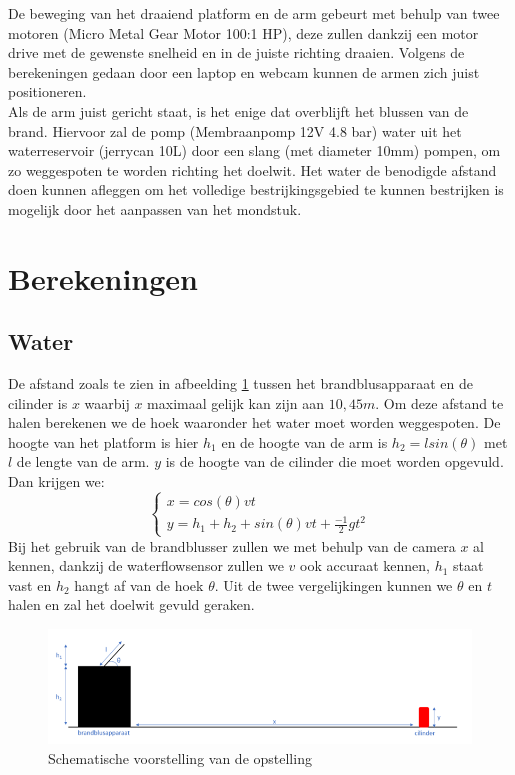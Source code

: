\documentclass[kulak]{kulakarticle} %
\begin{document}
De beweging van het draaiend platform en de arm gebeurt met behulp van twee motoren (Micro Metal Gear Motor 100:1 HP), deze zullen dankzij een motor drive met de gewenste snelheid en in de juiste richting draaien. Volgens de berekeningen gedaan door een laptop en webcam kunnen de armen zich juist positioneren. \\

Als de arm juist gericht staat, is het enige dat overblijft het blussen van de brand. Hiervoor zal de pomp (Membraanpomp 12V 4.8 bar) water uit het waterreservoir (jerrycan 10L) door een slang (met diameter 10mm) pompen, om zo weggespoten te worden richting het doelwit. Het water de benodigde afstand doen kunnen afleggen om het volledige bestrijkingsgebied te kunnen bestrijken is mogelijk door het aanpassen van het mondstuk.


\section{Berekeningen}
\subsection{Water}

De afstand zoals te zien in afbeelding \ref{schematische voorstelling} tussen het brandblusapparaat en de cilinder is \(x\) waarbij \(x\) maximaal gelijk kan zijn aan \(10,45 m\). Om deze afstand te halen berekenen we de hoek waaronder het water moet worden weggespoten. De hoogte van het platform is hier \(h_1\) en de hoogte van de arm is \(h_2 = lsin(\theta)\) met \(l\) de lengte van de arm. \(y\) is de hoogte van de cilinder die moet worden opgevuld. Dan krijgen we:
\begin{equation}
	\begin{cases}
		x  = cos(\theta) v t \\
		y = h_1 + h_2 + sin(\theta) v t + \frac{-1}{2} g t^2
	\end{cases}
\end{equation}
Bij het gebruik van de brandblusser zullen we met behulp van de camera \(x\) al kennen, dankzij de waterflowsensor zullen we \(v\) ook accuraat kennen, \(h_1\) staat vast en \(h_2\) hangt af van de hoek \(\theta\). Uit de twee vergelijkingen kunnen we \(\theta\) en \(t\) halen en zal het doelwit gevuld geraken.
\begin{figure} [h!]
	\centering
	\includegraphics[width = 1 \textwidth]{schematische voorstelling water LATEX}
	\caption{Schematische voorstelling van de opstelling}
	\label{schematische voorstelling}
\end{figure}
\end{document}
